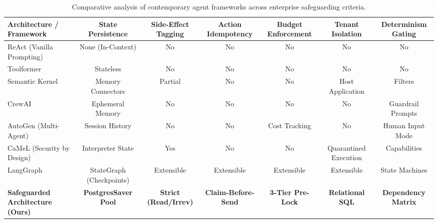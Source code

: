 \documentclass[10pt,a4paper,twocolumn]{article}
\begin{document}
\begin{table}[t]
\centering
\caption{Comparative analysis of contemporary agent frameworks across enterprise safeguarding criteria.}
\label{tab:framework_compare}
\footnotesize
\begin{tabularx}{\textwidth}{@{}p{4.2cm} *{6}{C}@{}}
\toprule
\textbf{Architecture / Framework} & \textbf{State Persistence} & \textbf{Side-Effect Tagging} & \textbf{Action Idempotency} & \textbf{Budget Enforcement} & \textbf{Tenant Isolation} & \textbf{Determinism Gating} \\
\midrule
ReAct (Vanilla Prompting) \cite{yao2023react} & None (In-Context) & No & No & No & No & No \\
Toolformer \cite{schick2023toolformer} & Stateless & No & No & No & No & No \\
Semantic Kernel \cite{wang2024agents} & Memory Connectors & Partial & No & No & Host Application & Filters \\
CrewAI \cite{wang2024agents} & Ephemeral Memory & No & No & No & No & Guardrail Prompts \\
AutoGen (Multi-Agent) \cite{wang2024agents} & Session History & No & No & Cost Tracking & No & Human Input Mode \\
CaMeL (Security by Design) \cite{debenedetti2025camel} & Interpreter State & Yes & No & No & Quarantined Execution & Capabilities \\
LangGraph \cite{anthropic2024effective} & StateGraph (Checkpoints) & Extensible & Extensible & Extensible & Extensible & State Machines \\
\textbf{Safeguarded Architecture (Ours)} & \textbf{PostgresSaver Pool} & \textbf{Strict (Read/Irrev)} & \textbf{Claim-Before-Send} & \textbf{3-Tier Pre-Lock} & \textbf{Relational SQL} & \textbf{Dependency Matrix} \\
\bottomrule
\end{tabularx}
\end{table}
\end{document}
